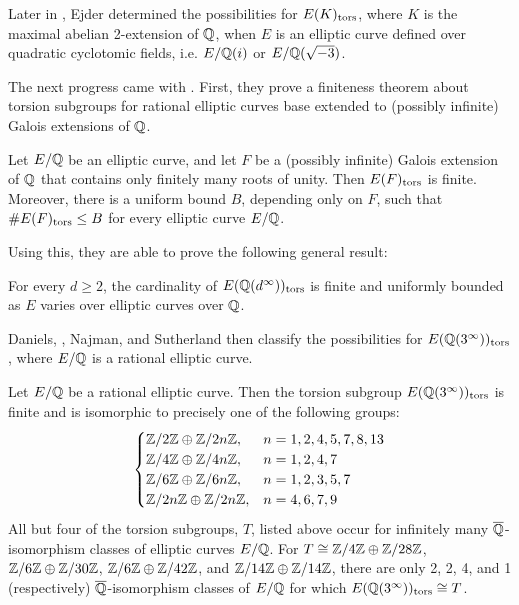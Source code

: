 Later in \cite{ejder18}, Ejder determined the possibilities for $E(K)_{\text{tors}}$, where $K$ is the maximal abelian 2-extension of $\mathbb{Q}$, when $E$ is an elliptic curve defined over quadratic cyclotomic fields, i.e. $E/\mathbb{Q}(i)$ or $E/\mathbb{Q}(\sqrt{-3})$. 


The next progress came with \cite{danielslozrobnajmansutherland18}. First, they prove a finiteness theorem about torsion subgroups for rational elliptic curves base extended to (possibly infinite) Galois extensions of $\mathbb{Q}$.


\begin{thm}
Let $E/\mathbb{Q}$ be an elliptic curve, and let $F$ be a (possibly infinite) Galois extension of $\mathbb{Q}$ that contains only finitely many roots of unity. Then $E(F)_{\text{tors}}$ is finite. Moreover, there is a uniform bound $B$, depending only on $F$, such that $\#E(F)_{\text{tors}} \leq B$ for every elliptic curve $E/\mathbb{Q}$. 
\end{thm}


Using this, they are able to prove the following general result:


\begin{prop}
For every $d \geq 2$, the cardinality of $E(\mathbb{Q}(d^\infty))_{\text{tors}}$ is finite and uniformly bounded as $E$ varies over elliptic curves over $\mathbb{Q}$. 
\end{prop}


Daniels, \lozrob{}, Najman, and Sutherland then classify the possibilities for $E(\mathbb{Q}(3^\infty))_{\text{tors}}$, where $E/\mathbb{Q}$ is a rational elliptic curve. 


\begin{thm} \label{thm:cubiccompositum}
Let $E/\mathbb{Q}$ be a rational elliptic curve. Then the torsion subgroup $E(\mathbb{Q}(3^\infty))_{\text{tors}}$ is finite and is isomorphic to precisely one of the following groups:
	\[
	\begin{cases}
	\mathbb{Z}/2\mathbb{Z} \oplus \mathbb{Z}/2n\mathbb{Z}, & n= 1, 2, 4, 5, 7, 8, 13 \\
	\mathbb{Z}/4\mathbb{Z} \oplus \mathbb{Z}/4n\mathbb{Z}, & n= 1, 2, 4, 7 \\
	\mathbb{Z}/6\mathbb{Z} \oplus \mathbb{Z}/6n\mathbb{Z}, & n= 1, 2, 3, 5, 7 \\
	\mathbb{Z}/2n\mathbb{Z} \oplus \mathbb{Z}/2n\mathbb{Z}, & n= 4, 6, 7, 9 \\
	\end{cases}
	\]
All but four of the torsion subgroups, $T$, listed above occur for infinitely many $\overline{\mathbb{Q}}$-isomorphism classes of elliptic curves $E/\mathbb{Q}$. For $T \cong \mathbb{Z}/4\mathbb{Z} \oplus \mathbb{Z}/28\mathbb{Z}$, $\mathbb{Z}/6\mathbb{Z} \oplus \mathbb{Z}/30\mathbb{Z}$, $\mathbb{Z}/6\mathbb{Z} \oplus \mathbb{Z}/42\mathbb{Z}$, and $\mathbb{Z}/14\mathbb{Z} \oplus \mathbb{Z}/14\mathbb{Z}$, there are only 2, 2, 4, and 1 (respectively) $\overline{\mathbb{Q}}$-isomorphism classes of $E/\mathbb{Q}$ for which $E(\mathbb{Q}(3^\infty))_{\text{tors}} \cong T$. 
\end{thm}


